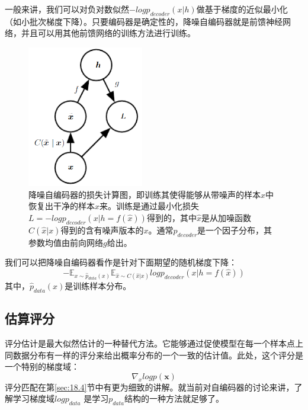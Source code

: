 一般来讲，我们可以对负对数似然$-log p_{decoder}(x|h)$做基于梯度的近似最小化（如小批次梯度下降）。只要编码器是确定性的，降噪自编码器就是前馈神经网络，并且可以用其他前馈网络的训练方法进行训练。
\begin{figure}[htbp] %
   \centering
   \includegraphics[width=2in]{fig/chap14/14_3.png} 
   \caption{降噪自编码器的损失计算图，即训练其使得能够从带噪声的样本$\hat{x}$中恢复出干净的样本$x$来。训练是通过最小化损失$L = -log p_{decoder}(x|h = f(\hat{x}))$得到的，其中$\hat{x}$是从加噪函数$C(\hat{x}|x)$得到的含有噪声版本的$x$。通常$p_{decoder}$是一个因子分布，其参数均值由前向网络$g$给出。}
   \label{fig:14.3}
\end{figure}

我们可以把降噪自编码器看作是针对下面期望的随机梯度下降：
\begin{equation}
 -\mathbb{E}_{x\sim \hat{p}_{data}(x)}\mathbb{E}_{\hat{x} \sim C(\hat{x}|x)}log p_{decoder}(x| h = f(\hat{x}))
\end{equation}
其中，$\hat{p}_{data}(x)$是训练样本分布。

\subsection{估算评分}
\label{sec:14.5.1}
评分估计是最大似然估计的一种替代方法。它能够通过促使模型在每一个样本点上同数据分布有一样的评分来给出概率分布的一个一致的估计值。此处，这个评分是一个特别的梯度域：
\begin{equation}
	\nabla_x log p(\bm{x})
\end{equation}
评分匹配在第\ref{sec:18.4}节中有更为细致的讲解。就当前对自编码器的讨论来讲，了解学习梯度域$log p_{data}$ 是学习$p_{data}$结构的一种方法就足够了。

